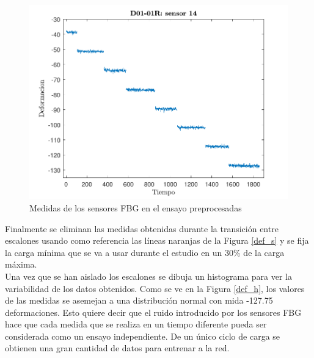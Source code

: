 \begin{figure}[h!]
    \centering
    \includegraphics[width=125mm, angle=0]{3/Fotos/Procesado_FBG.pdf}
    \captionsetup{justification=centering,margin=1.25cm}
    \caption{Medidas de los sensores FBG en el ensayo preprocesadas}
    \label{def_p}
\end{figure}    
    
Finalmente se eliminan las medidas obtenidas durante la transición entre escalones usando como referencia las líneas naranjas de la Figura \ref{def_s} y se fija la carga mínima que se va a usar durante el estudio en un 30\% de la carga máxima.\\
    
Una vez que se han aislado los escalones se dibuja un histograma para ver la variabilidad de los datos obtenidos. Como se ve en la Figura \ref{def_h}, los valores de las medidas se asemejan a una distribución normal con mida -127.75 deformaciones. Esto quiere decir que el ruido introducido por los sensores FBG hace que cada medida que se realiza en un tiempo diferente pueda ser considerada como un ensayo independiente. De un único ciclo de carga se obtienen una gran cantidad de datos para entrenar a la red.\\

